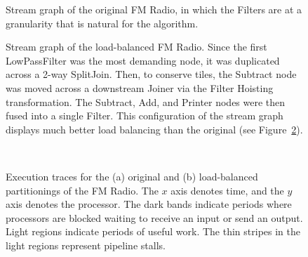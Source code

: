 \begin{figure}
\centering
{}
\caption{\protect\small Stream graph of the original FM Radio, in
which the Filters are at a granularity that is natural for the
algorithm. \protect\label{fig:fm-orig}}
\vspace{36pt}
\caption{\protect\small Stream graph of the load-balanced FM Radio.
Since the first LowPassFilter was the most demanding node, it was
duplicated across a 2-way SplitJoin.  Then, to conserve tiles, the
Subtract node was moved across a downstream Joiner via the Filter
Hoisting transformation.  The Subtract, Add, and Printer nodes were
then fused into a single Filter.  This configuration of the stream
graph displays much better load balancing than the original (see
Figure~\ref{fig:fm-blood}).  \protect\label{fig:fm-opt}}
\end{figure}

\begin{figure}
  \begin{center}  \\
    \hspace{0.3in}  \vspace{-6pt} \caption{Execution traces for the (a)
    original and (b) load-balanced partitionings of the FM Radio.  The
    $x$ axis denotes time, and the $y$ axis denotes the processor.
    The dark bands indicate periods where processors are blocked
    waiting to receive an input or send an output.  Light regions
    indicate periods of useful work.  The thin stripes in the light
    regions represent pipeline stalls.  \protect\label{fig:fm-blood}}
    \vspace{-6pt}
\end{center}
\end{figure}

